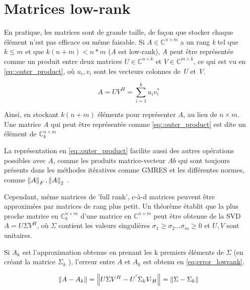 
\section{Matrices low-rank}
    
En pratique, les matrices sont de grande taille, de façon que stocker chaque élément n'est pas efficace ou même faisable.  Si $A \in \mathbb{C}^{n\times m}$ a un rang \textit{k} tel que $k \leq m$ et que $k(n+m) < n*m$ (\textit{A} est low-rank), \textit{A} peut être représentée comme un produit entre deux matrices $U \in \mathbb{C}^{n\times k} $ et $V \in \mathbb{C}^{m\times k}$, ce qui est vu en \ref{eq::outer_product}, où $u_{i}, v_{i}$ sont les vecteurs colonnes de \textit{U} et \textit{V}.

\begin{equation}\label{eq::outer_product}
    A = UV^{H} = \sum_{i=1} ^{k} u_{i} v_{i} ^{*}
\end{equation}

Ainsi, en stockant $k(n+m)$ éléments pour représenter $A$, au lieu de $n\times m$. Une matrice \textit{A} qui peut être représentée comme \ref{eq::outer_product} est dite un élément de $\mathbb{C}^{n\times m}_{k}$

La représentation en \ref{eq::outer_product} facilite aussi des autres opérations possibles avec $A$, comme les produits matrice-vecteur $Ab$ qui sont toujours présents dans les méthodes itératives comme GMRES \cite{bebendorf2008hierarchical} et les différentes normes, comme $\left\lVert A\right\rVert_{F}, \left\lVert A\right\rVert_{2}$ \cite{bebendorf2008hierarchical}. 

Cependant, même matrices de 'full rank', c-à-d matrices peuvent être approximées par matrices de rang plus petit. Un théorème \cite{bebendorf2008hierarchical} établit que la plus proche matrice en $\mathbb{C}^{n\times m}_{k}$ d'une matrice en $\mathbb{C}^{n\times m}$ peut être obtenue de la SVD $A = U \Sigma V^{H}$, où $\Sigma$ contient les valeurs singulières $\sigma_{1} \geq \sigma_{2} \dots \sigma_{m} \geq 0$ et $U,V$ sont unitaires.

Si $ A_{k} $ est l'approximation obtenue en prenant les k premiers éléments de $\Sigma$ (en créant la matrice $ \Sigma_{k} $ ), l'erreur entre $ A $ et $ A_{k} $ est obtenu en \ref{eq:error_lowrank}.

\begin{equation}\label{eq:error_lowrank}
    \left\lVert A-A_{k}\right\rVert = \left\lVert U\Sigma V^{H} - U^{'} \Sigma_{k} V_{' H}\right\rVert = \left\lVert\Sigma - \Sigma_{k}\right\rVert 
\end{equation}

